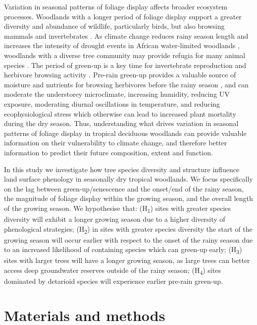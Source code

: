 \documentclass[11pt,a4paper]{article}
\begin{document}
Variation in seasonal patterns of foliage display affects broader ecosystem
processes. Woodlands with a longer period of foliage display support a greater
diversity and abundance of wildlife, particularly birds, but also browsing
mammals and invertebrates \citep{Cole2015, Araujo2017, Morellato2016,
Ogutu2013}. As climate change reduces rainy season length and increases the
intensity of drought events in African water-limited woodlands \citep{Cook2020,
Gore2019}, woodlands with a diverse tree community may provide refugia for many
animal species \citep{Bale2002}. The period of green-up is a key time for
invertebrate reproduction \citep{Prather2012} and herbivore browsing activity
\citep{Velasque2016, Morellato2016}. Pre-rain green-up provides a valuable
source of moisture and nutrients for browsing herbivores before the rainy
season \citep{Makhado2018}, and can moderate the understorey microclimate,
increasing humidity, reducing UV exposure, moderating diurnal oscillations in
temperature, and reducing ecophysiological stress which otherwise can lead to
increased plant mortality during the dry season. Thus, understanding what
drives variation in seasonal patterns of foliage display in tropical deciduous
woodlands can provide valuable information on their vulnerability to climate
change, and therefore better information to predict their future composition,
extent and function.

In this study we investigate how tree species diversity and structure influence
land surface phenology in seasonally dry tropical woodlands. We focus
specifically on the lag between green-up/senescence and the onset/end of the
rainy season, the magnitude of foliage display within the growing season, and
the overall length of the growing season. We hypothesise that:
(H\textsubscript{1}) sites with greater species diversity will exhibit a longer
growing season due to a higher diversity of phenological strategies;
(H\textsubscript{2}) in sites with greater species diversity the start of the
growing season will occur earlier with respect to the onset of the rainy season
due to an increased likelihood of containing species which can green-up early;
(H\textsubscript{3}) sites with larger trees will have a longer growing season,
as large trees can better access deep groundwater reserves outside of the rainy
season; (H\textsubscript{4}) sites dominated by detarioid species will
experience earlier pre-rain green-up. 

\section{Materials and methods}
\end{document}

